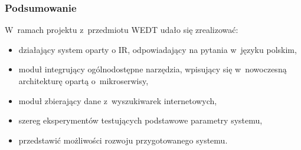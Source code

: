 \documentclass{beamer}
\begin{document}
\begin{frame}
  \frametitle{Podsumowanie}
  W~ramach projektu z~przedmiotu WEDT udało się zrealizować:
  \begin{itemize}
    \item działający system oparty o IR, odpowiadający na pytania w~języku polskim,
    \item moduł integrujący ogólnodostępne narzędzia, wpisujący się w~nowoczesną architekturę opartą o~mikroserwisy,
    \item moduł zbierający dane z~wyszukiwarek internetowych,
    \item szereg eksperymentów testujących podstawowe parametry systemu,
    \item przedstawić możliwości rozwoju przygotowanego systemu.
  \end{itemize}

\end{frame}
\end{document}
